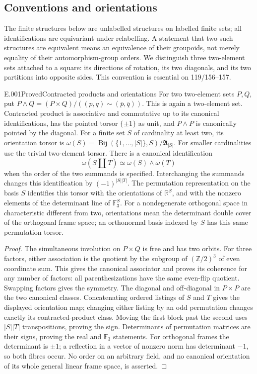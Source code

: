 \subsection{Conventions and orientations}
The finite structures below are unlabelled structures on labelled finite sets;
all identifications are equivariant under relabelling. A statement that two
such structures are equivalent means an equivalence of their groupoids,
not merely equality of their automorphism-group orders. We distinguish
three two-element sets attached to a square: its directions of rotation,
its two diagonals, and its two partitions into opposite sides. This
convention is essential on 119/156--157.

\begin{saresult}{E.001}{Proved}{Contracted products and orientations}
For two two-element sets $P,Q$, put
$P\wedge Q=(P\times Q)/((p,q)\sim(\bar p,\bar q))$.
This is again a two-element set. Contracted product is associative and
commutative up to its canonical identifications, has the pointed torsor
$\{\pm1\}$ as unit, and $P\wedge P$ is canonically pointed by the diagonal.
For a finite set $S$ of cardinality at least two, its orientation torsor is
$\omega(S)=\operatorname{Bij}(\{1,\ldots,|S|\},S)/\mathfrak A_{|S|}$.
For smaller cardinalities use the trivial two-element torsor. There is a
canonical identification
\[
 \omega(S\amalg T)\simeq\omega(S)\wedge\omega(T)
\]
when the order of the two summands is specified. Interchanging the summands
changes this identification by $(-1)^{|S||T|}$. The permutation representation
on the basis $S$ identifies this torsor with the orientations of $\mathbb R^S$,
and with the nonzero elements of the determinant line of $\mathbb F_3^S$.
For a nondegenerate orthogonal space in characteristic different from two,
orientations mean the determinant double cover of the orthogonal frame
space; an orthonormal basis indexed by $S$ has this same permutation torsor.
\end{saresult}
\begin{proof}
The simultaneous involution on $P\times Q$ is free and has two orbits.
For three factors, either association is the quotient by the subgroup of
$(\mathbb Z/2)^3$ of even coordinate sum. This gives the canonical associator
and proves its coherence for any number of factors: all parenthesizations
have the same even-flip quotient. Swapping factors gives the symmetry.
The diagonal and off-diagonal in $P\times P$ are the two canonical classes.
Concatenating ordered listings of $S$ and $T$ gives the displayed orientation
map; changing either listing by an odd permutation changes exactly its
contracted-product class. Moving the first block past the second uses
$|S||T|$ transpositions, proving the sign. Determinants of permutation
matrices are their signs, proving the real and $\mathbb F_3$ statements.
For orthogonal frames the determinant is $\pm1$; a reflection in a vector
of nonzero norm has determinant $-1$, so both fibres occur. No order on an
arbitrary field, and no canonical orientation of its whole general linear
frame space, is asserted.
\end{proof}

